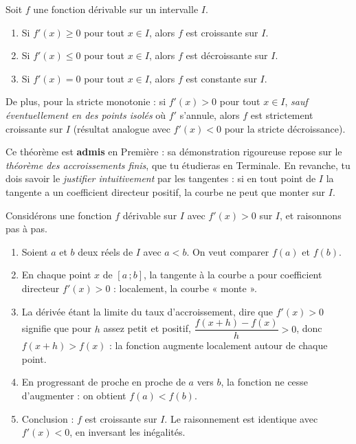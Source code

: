 \documentclass[11pt]{article}
\newcommand{\cle}[1]{{\popxbold\color{popdark}#1}}
\newcounter{popsec}
\newcounter{popsub}
\newcommand{\courssub}[1]{%
  \stepcounter{popsub}%
  \par\vspace{9pt}\noindent{\popxbold\fontsize{11.5}{13}\selectfont\color{popink}{\color{poporange}\thepopsec.\thepopsub}\hspace{6pt}#1}\par\nopagebreak\vspace{4pt}
}
\begin{document}
\courssub{Le théorème fondamental}

\begin{propriete}
Soit $f$ une fonction dérivable sur un intervalle $I$.
\begin{enumerate}
\item Si $f'(x) \geq 0$ pour tout $x \in I$, alors $f$ est \cle{croissante} sur $I$.
\item Si $f'(x) \leq 0$ pour tout $x \in I$, alors $f$ est \cle{décroissante} sur $I$.
\item Si $f'(x) = 0$ pour tout $x \in I$, alors $f$ est \cle{constante} sur $I$.
\end{enumerate}
De plus, pour la stricte monotonie : si $f'(x) > 0$ pour tout $x \in I$, \emph{sauf éventuellement en des points isolés} où $f'$ s'annule, alors $f$ est \cle{strictement croissante} sur $I$ (résultat analogue avec $f'(x) < 0$ pour la stricte décroissance).
\end{propriete}

\begin{attention}
Ce théorème est \textbf{admis} en Première : sa démonstration rigoureuse repose sur le \emph{théorème des accroissements finis}, que tu étudieras en Terminale. En revanche, tu dois savoir le \emph{justifier intuitivement} par les tangentes : si en tout point de $I$ la tangente a un coefficient directeur positif, la courbe ne peut que monter sur $I$.
\end{attention}

\begin{experience}
Considérons une fonction $f$ dérivable sur $I$ avec $f'(x) > 0$ sur $I$, et raisonnons pas à pas.
\begin{enumerate}
\item Soient $a$ et $b$ deux réels de $I$ avec $a < b$. On veut comparer $f(a)$ et $f(b)$.
\item En chaque point $x$ de $[a\,;b]$, la tangente à la courbe a pour coefficient directeur $f'(x) > 0$ : localement, la courbe « monte ».
\item La dérivée étant la limite du taux d'accroissement, dire que $f'(x) > 0$ signifie que pour $h$ assez petit et positif, $\dfrac{f(x+h)-f(x)}{h} > 0$, donc $f(x+h) > f(x)$ : la fonction augmente localement autour de chaque point.
\item En progressant de proche en proche de $a$ vers $b$, la fonction ne cesse d'augmenter : on obtient $f(a) < f(b)$.
\item Conclusion : $f$ est croissante sur $I$. Le raisonnement est identique avec $f'(x) < 0$, en inversant les inégalités.
\end{enumerate}
\end{experience}
\end{document}

